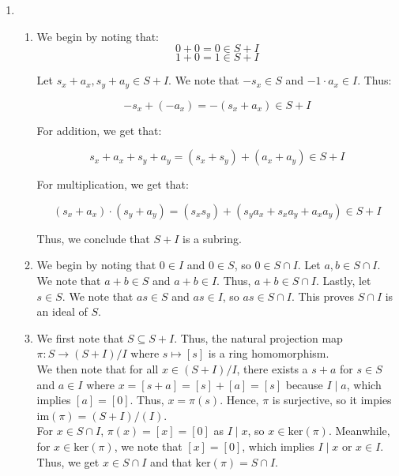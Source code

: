\documentclass{article}
\begin{document}
\begin{enumerate}

\item 

\begin{enumerate}
    \item 
    We begin by noting that: 
    $$0 + 0 = 0 \in S + I$$
    $$1 + 0 = 1 \in S + I$$

    Let $s_x + a_x, s_y + a_y \in S + I$. We note that $-s_x \in S$ and $-1 \cdot a_x \in I$. Thus: 

    $$-s_x + (-a_x) = -(s_x + a_x) \in S + I$$

    For addition, we get that: 

    $$s_x + a_x + s_y + a_y = (s_x + s_y) + (a_x + a_y) \in S + I$$

    For multiplication, we get that: 

    $$(s_x + a_x) \cdot (s_y + a_y) = (s_x s_y) + (s_ya_x + s_x a_y + a_x a_y) \in S + I$$

    Thus, we conclude that $S + I$ is a subring. \\

    \item
    We begin by noting that $0 \in I$ and $0 \in S$, so $0 \in S \cap I$. Let $a, b \in S \cap I$. We note that $a + b \in S$ and $a + b \in I$. Thus, $a + b \in S \cap I$. Lastly, let $s \in S$. We note that $as \in S$ and $as \in I$, so $as \in S \cap I$. This proves $S \cap I$ is an ideal of $S$. \\


    \item 
    We first note that $S \subseteq S + I$. Thus, the natural projection map $\pi: S \rightarrow (S+ I)/I$ where $s \mapsto [s]$ is a ring homomorphism. \\
    
    We then note that for all $x \in (S + I)/I$, there exists a $s + a$ for $s \in S$ and $a \in I$ where $x = [s + a] = [s] + [a] = [s]$ because $I \mid a$, which implies $[a] = [0]$. Thus, $x = \pi (s)$. Hence, $\pi$ is surjective, so it impies $\text{im}(\pi) = (S + I)/(I)$. \\
    
    For $x \in S \cap I$, $\pi(x) = [x] = [0]$ as $I \mid x$, so $x \in \text{ker}(\pi)$. Meanwhile, for $x \in \text{ker}(\pi)$, we note that $[x] = [0]$, which implies $I \mid x$ or $x \in I$. Thus, we get $x \in S \cap I$ and that $\text{ker}(\pi) = S \cap I$. \\
    

\end{enumerate}
\end{enumerate}
\end{document}
